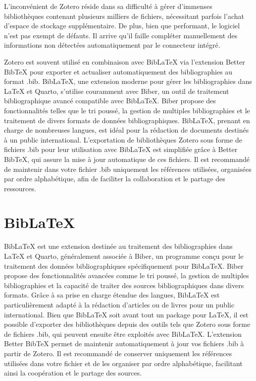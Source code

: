 \documentclass[
  letterpaper,
]{scrbook}
\begin{document}
L'inconvénient de Zotero réside dans sa difficulté à gérer d'immenses
bibliothèques contenant plusieurs milliers de fichiers, nécessitant
parfois l'achat d'espace de stockage supplémentaire. De plus, bien que
performant, le logiciel n'est pas exempt de défauts. Il arrive qu'il
faille compléter manuellement des informations non détectées
automatiquement par le connecteur intégré.

Zotero est souvent utilisé en combinaison avec BibLaTeX via l'extension
Better BibTeX pour exporter et actualiser automatiquement des
bibliographies au format .bib. BibLaTeX, une extension moderne pour
gérer les bibliographies dans LaTeX et Quarto, s'utilise couramment avec
Biber, un outil de traitement bibliographique avancé compatible avec
BibLaTeX. Biber propose des fonctionnalités telles que le tri poussé, la
gestion de multiples bibliographies et le traitement de divers formats
de données bibliographiques. BibLaTeX, prenant en charge de nombreuses
langues, est idéal pour la rédaction de documents destinés à un public
international. L'exportation de bibliothèques Zotero sous forme de
fichiers .bib pour leur utilisation avec BibLaTeX est simplifiée grâce à
Better BibTeX, qui assure la mise à jour automatique de ces fichiers. Il
est recommandé de maintenir dans votre fichier .bib uniquement les
références utilisées, organisées par ordre alphabétique, afin de
faciliter la collaboration et le partage des ressources.

\hypertarget{biblatex}{%
\section{BibLaTeX}\label{biblatex}}

BibLaTeX est une extension destinée au traitement des bibliographies
dans LaTeX et Quarto, généralement associée à Biber, un programme conçu
pour le traitement des données bibliographiques spécifiquement pour
BibLaTeX. Biber propose des fonctionnalités avancées comme le tri
poussé, la gestion de multiples bibliographies et la capacité de traiter
des sources bibliographiques dans divers formats. Grâce à sa prise en
charge étendue des langues, BibLaTeX est particulièrement adapté à la
rédaction d'articles ou de livres pour un public international. Bien que
BibLaTeX soit avant tout un package pour LaTeX, il est possible
d'exporter des bibliothèques depuis des outils tels que Zotero sous
forme de fichiers .bib, qui peuvent ensuite être exploités avec
BibLaTeX. L'extension Better BibTeX permet de maintenir automatiquement
à jour vos fichiers .bib à partir de Zotero. Il est recommandé de
conserver uniquement les références utilisées dans votre fichier et de
les organiser par ordre alphabétique, facilitant ainsi la coopération et
le partage des sources.
\end{document}
